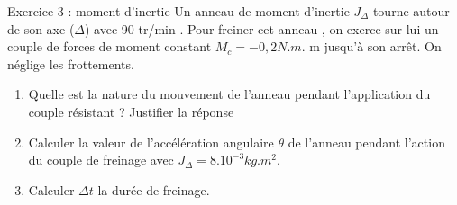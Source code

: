 \documentclass[12pt, french]{article}
\begin{document}
\begin{Box2}{Exercice 3 : moment d’inertie }
  Un anneau de moment d’inertie $J_{\Delta}$ tourne autour de son axe ($\Delta$) avec 90 tr/min .
Pour freiner cet anneau , on exerce sur lui un couple de forces de moment constant
$M_c = -0,2N.m$. m jusqu’à son arrêt.
On néglige les frottements.
\begin{enumerate}
  \item Quelle est la nature du mouvement de l’anneau pendant l’application du couple
résistant ? Justifier la réponse  
\item Calculer la valeur de l’accélération angulaire $\theta$ de l’anneau pendant l’action du
  couple de freinage avec $J_{\Delta} = 8.10^{-3}kg.m^2$.
\item Calculer $\Delta{t}$ la durée de freinage.

\end{enumerate}
\end{Box2}
\end{document}
